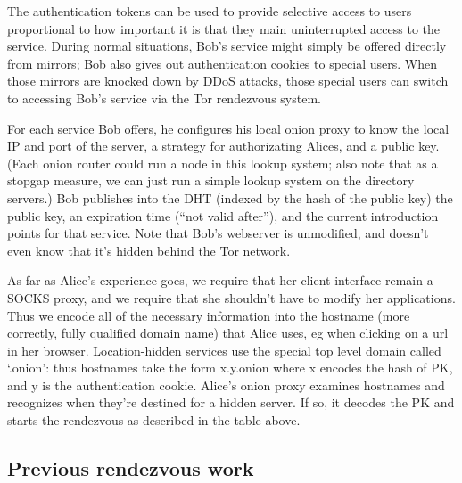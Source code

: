 \documentclass[times,10pt,twocolumn]{article}
\begin{document}
The authentication tokens can be used to provide selective access to users
proportional to how important it is that they main uninterrupted access
to the service. During normal situations, Bob's service might simply be
offered directly from mirrors; Bob also gives out authentication cookies
to special users. When those mirrors are knocked down by DDoS attacks,
those special users can switch to accessing Bob's service via the Tor
rendezvous system.


For each service Bob offers, he configures his local onion proxy to know
the local IP and port of the server, a strategy for authorizating Alices,
and a public key. (Each onion router could run a node in this lookup
system; also note that as a stopgap measure, we can just run a simple
lookup system on the directory servers.)  Bob publishes into the DHT
(indexed by the hash of the public key) the public key, an expiration
time (``not valid after''), and the current introduction points for that
service. Note that Bob's webserver is unmodified, and doesn't even know
that it's hidden behind the Tor network.

As far as Alice's experience goes, we require that her client interface
remain a SOCKS proxy, and we require that she shouldn't have to modify
her applications. Thus we encode all of the necessary information into
the hostname (more correctly, fully qualified domain name) that Alice
uses, eg when clicking on a url in her browser. Location-hidden services
use the special top level domain called `.onion': thus hostnames take the
form x.y.onion where x encodes the hash of PK, and y is the authentication
cookie. Alice's onion proxy examines hostnames and recognizes when they're
destined for a hidden server. If so, it decodes the PK and starts the
rendezvous as described in the table above.

\subsection{Previous rendezvous work}
\end{document}
